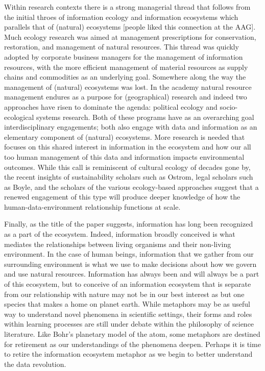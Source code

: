 Within research contexts there is a strong managerial thread that follows from the initial throes of information ecology and information ecosystems which parallels that of (natural) ecosystems [people liked this connection at the AAG]. Much ecology research was aimed at management prescriptions for conservation, restoration, and management of natural resources. This thread was quickly adopted by corporate business managers for the management of information resources, with the more efficient management of material resources as supply chains and commodities as an underlying goal. Somewhere along the way the management of (natural) ecosystems was lost. In the academy natural resource management endures as a purpose for (geographical) research and indeed two approaches have risen to dominate the agenda: political ecology and socio-ecological systems research. Both of these programs have as an overarching goal interdisciplinary engagements; both also engage with data and information as an elementary component of (natural) ecosystems. More research is needed that focuses on this shared interest in information in the ecosystem and how our all too human management of this data and information impacts environmental outcomes. While this call is reminiscent of cultural ecology of decades gone by, the recent insights of sustainability scholars such as Ostrom, legal scholars such as Boyle, and the scholars of the various ecology-based approaches suggest that a renewed engagement of this type will produce deeper knowledge of how the human-data-environment relationship functions at scale.

Finally, as the title of the paper suggests, information has long been recognized as a part of the ecosystem. Indeed, information broadly conceived is what mediates the relationships between living organisms and their non-living environment. In the case of human beings, information that we gather from our surrounding environment is what we use to make decisions about how we govern and use natural resources. Information has always been and will always be a part of this ecosystem, but to conceive of an information ecosystem that is separate from our relationship with nature may not be in our best interest as but one species that makes a home on planet earth. While metaphors may be as useful way to understand novel phenomena in scientific settings, their forms and roles within learning processes are still under debate within the philosophy of science literature. Like Bohr's planetary model of the atom, some metaphors are destined for retirement as our understandings of the phenomena deepen. Perhaps it is time to retire the information ecosystem metaphor as we begin to better understand the data revolution.